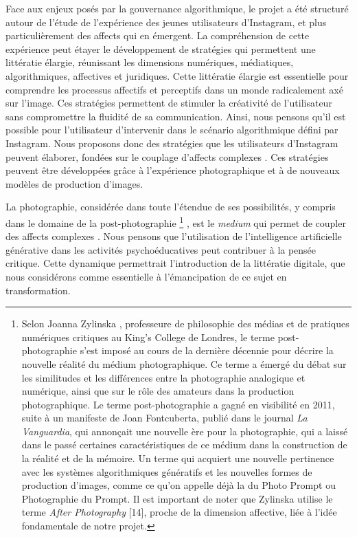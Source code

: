 \documentclass[final,fra]{anthology-ch}         %
\begin{document}
Face aux enjeux posés par la gouvernance algorithmique, le projet a été structuré autour de l'étude de l'expérience des jeunes utilisateurs d'Instagram, et plus particulièrement des affects qui en émergent. La compréhension de cette expérience peut étayer le développement de stratégies qui permettent une littératie élargie, réunissant les dimensions numériques, médiatiques, algorithmiques, affectives et juridiques. Cette littératie élargie est essentielle pour 
comprendre les processus affectifs et perceptifs dans un monde radicalement axé sur l'image. Ces stratégies permettent de stimuler la créativité de l'utilisateur sans compromettre la fluidité de sa communication. Ainsi, nous pensons qu'il est possible pour l'utilisateur d'intervenir dans le scénario algorithmique défini par Instagram. Nous proposons donc des stratégies que les utilisateurs d'Instagram peuvent élaborer, fondées sur le couplage d'affects complexes \cite{torraca2024antropofagia}. Ces stratégies peuvent être développées grâce à l'expérience photographique et à de nouveaux modèles de production d'images.

La photographie, considérée dans toute l'étendue de ses possibilités, y compris dans le domaine de la post-photographie
\footnote{Selon Joanna Zylinska \cite{zylinska_perception_2023}, professeure de philosophie des médias et de pratiques numériques critiques au King's College de Londres, le terme \og post-photographie\fg{} s'est imposé au cours de la dernière décennie pour décrire la nouvelle réalité du médium photographique. Ce terme a émergé du débat sur les similitudes et les différences entre la photographie analogique et numérique, ainsi que sur le rôle des \og amateurs\fg{} dans la production photographique. Le terme \og post-photographie\fg{} a gagné en visibilité en 2011, suite à un manifeste de Joan Fontcuberta, publié dans le journal \textit{La Vanguardia}, qui annonçait une nouvelle ère pour la photographie, qui a laissé dans le passé certaines caractéristiques de ce médium dans la construction de la réalité et de la mémoire. Un terme qui acquiert une nouvelle pertinence avec les systèmes algorithmiques génératifs et les nouvelles formes de production d'images, comme ce qu'on appelle déjà la du \og Photo Prompt\fg{} ou \og Photographie du Prompt\fg{}. Il est important de noter que Zylinska utilise le terme \textit{After Photography} [14], proche de la dimension affective, liée à l'idée fondamentale de notre projet.}
, est le \emph{medium} qui permet de coupler des affects complexes \cite{torraca2024antropofagia}. Nous pensons que l'utilisation de l'intelligence artificielle générative dans les activités psychoéducatives \cite{ponciano2024praticas} peut contribuer à la pensée critique. Cette dynamique permettrait l'introduction de la littératie digitale, que nous considérons comme essentielle à l'émancipation de ce sujet en transformation.
\end{document}
